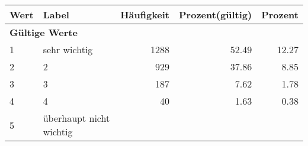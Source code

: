      \begin{longtable}{lXrrr}
     \toprule
     \textbf{Wert} & \textbf{Label} & \textbf{Häufigkeit} & \textbf{Prozent(gültig)} & \textbf{Prozent} \\
     \endhead
     \midrule
     \multicolumn{5}{l}{\textbf{Gültige Werte}}\\

     1 &
     \multicolumn{1}{X}{ sehr wichtig   } &


       \num{1288} &
       \num[round-mode=places,round-precision=2]{52.49} &
         \num[round-mode=places,round-precision=2]{12.27} \\

     2 &
     \multicolumn{1}{X}{ 2   } &


       \num{929} &
       \num[round-mode=places,round-precision=2]{37.86} &
         \num[round-mode=places,round-precision=2]{8.85} \\

     3 &
     \multicolumn{1}{X}{ 3   } &


       \num{187} &
       \num[round-mode=places,round-precision=2]{7.62} &
         \num[round-mode=places,round-precision=2]{1.78} \\

     4 &
     \multicolumn{1}{X}{ 4   } &


       \num{40} &
       \num[round-mode=places,round-precision=2]{1.63} &
         \num[round-mode=places,round-precision=2]{0.38} \\

     5 &
     \multicolumn{1}{X}{ überhaupt nicht wichtig   } &



\end{longtable}
